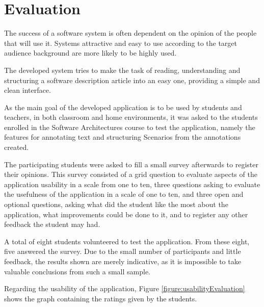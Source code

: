 
\chapter{Evaluation}
\label{chapter:evaluation}

The success of a software system is often dependent on the opinion of the people that will use it. Systems attractive and easy to use according to the target audience background are more likely to be highly used.

The developed system tries to make the task of reading, understanding and structuring a software description article into an easy one, providing a simple and clean interface.

As the main goal of the developed application is to be used by students and teachers, in both classroom and home environments, it was asked to the students enrolled in the Software Architectures course to test the application, namely the features for annotating text and structuring Scenarios from the annotations created.

The participating students were asked to fill a small survey afterwards to register their opinions.
This survey consisted of a grid question to evaluate aspects of the application usability in a scale from one to ten, three questions asking to evaluate the usefulness of the application in a scale of one to ten, and three open and optional questions, asking what did the student like the most about the application, what improvements could be done to it, and to register any other feedback the student may had.

A total of eight students volunteered to test the application. From these eight, five answered the survey. Due to the small number of participants and little feedback, the results shown are merely indicative, as it is impossible to take valuable conclusions from such a small sample.

Regarding the usability of the application, Figure \ref{figure:usabilityEvaluation} shows the graph containing the ratings given by the students.


